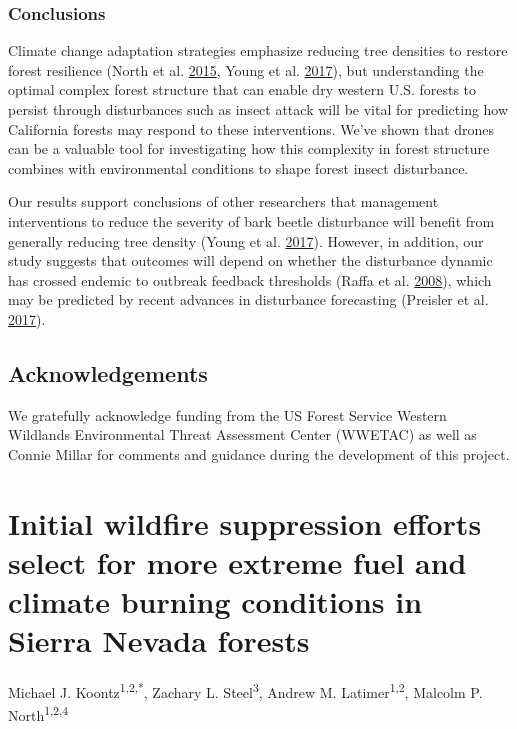 \documentclass[twoside,12pt,final]{ucthesis-CA2012}
\begin{document}
\begin{ucmainmatter}
\subsection{Conclusions}\label{conclusions-1}

Climate change adaptation strategies emphasize reducing tree densities
to restore forest resilience (North et al.
\protect\hyperlink{ref-north2015}{2015}, Young et al.
\protect\hyperlink{ref-young2017}{2017}), but understanding the optimal
complex forest structure that can enable dry western U.S. forests to
persist through disturbances such as insect attack will be vital for
predicting how California forests may respond to these interventions.
We've shown that drones can be a valuable tool for investigating how
this complexity in forest structure combines with environmental
conditions to shape forest insect disturbance.

Our results support conclusions of other researchers that management
interventions to reduce the severity of bark beetle disturbance will
benefit from generally reducing tree density (Young et al.
\protect\hyperlink{ref-young2017}{2017}). However, in addition, our
study suggests that outcomes will depend on whether the disturbance
dynamic has crossed endemic to outbreak feedback thresholds (Raffa et
al. \protect\hyperlink{ref-raffa2008}{2008}), which may be predicted by
recent advances in disturbance forecasting (Preisler et al.
\protect\hyperlink{ref-preisler2017}{2017}).

\section{Acknowledgements}\label{acknowledgements-1}

We gratefully acknowledge funding from the US Forest Service Western
Wildlands Environmental Threat Assessment Center (WWETAC) as well as
Connie Millar for comments and guidance during the development of this
project.

\chapter{Initial wildfire suppression efforts select for more extreme
fuel and climate burning conditions in Sierra Nevada
forests}\label{initial-wildfire-suppression-efforts-select-for-more-extreme-fuel-and-climate-burning-conditions-in-sierra-nevada-forests}

 Michael J.
Koontz\textsuperscript{1,2,*}, Zachary L. Steel\textsuperscript{3},
Andrew M. Latimer\textsuperscript{1,2}, Malcolm P.
North\textsuperscript{1,2,4}


\end{ucmainmatter}
\end{document}
